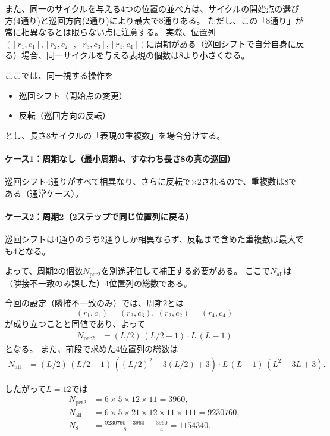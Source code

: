 \documentclass[a4paper,11pt,dvipdfmx]{jsarticle}
\theoremstyle{definition}
\begin{document}
また、同一のサイクルを与える4つの位置の並べ方は、サイクルの開始点の選び方(4通り)と巡回方向(2通り)により最大で$8$通りある。
ただし、この「$8$通り」が常に相異なるとは限らない点に注意する。
実際、位置列$([r_1,c_1],[r_2,c_2],[r_3,c_3],[r_4,c_4])$に周期がある（巡回シフトで自分自身に戻る）場合、同一サイクルを与える表現の個数は$8$より小さくなる。

ここでは、同一視する操作を
\begin{itemize}
  \item 巡回シフト（開始点の変更）
  \item 反転（巡回方向の反転）
\end{itemize}
とし、長さ8サイクルの「表現の重複数」を場合分けする。

\paragraph{ケース1：周期なし（最小周期4、すなわち長さ8の真の巡回）}
巡回シフト$4$通りがすべて相異なり、さらに反転で$\times 2$されるので、重複数は$8$である（通常ケース）。

\paragraph{ケース2：周期2（2ステップで同じ位置列に戻る）}
巡回シフトは$4$通りのうち$2$通りしか相異ならず、反転まで含めた重複数は最大でも$4$となる。

よって、周期2の個数$N_{\mathrm{per2}}$を別途評価して補正する必要がある。
ここで$N_{\mathrm{all}}$は（隣接不一致のみ課した）4位置列の総数である。

今回の設定（隣接不一致のみ）では、周期2とは
\[(r_1,c_1)=(r_3,c_3),\ (r_2,c_2)=(r_4,c_4)\]
が成り立つことと同値であり、よって
\begin{align}
  N_{\mathrm{per2}} &= (L/2)\,(L/2-1)\cdot L\,(L-1)
\end{align}
となる。
また、前段で求めた4位置列の総数は
\begin{align}
  N_{\mathrm{all}} &= (L/2)\,(L/2-1)\,\left((L/2)^2-3(L/2)+3\right)\cdot L\,(L-1)\,\left(L^2-3L+3\right).
\end{align}

したがって$L=12$では
\begin{align}
  N_{\mathrm{per2}} &= 6\times 5\times 12\times 11 = 3960,\\
  N_{\mathrm{all}} &= 6\times 5\times 21\times 12\times 11\times 111 = 9230760,\\
  N_8 &= \frac{9230760-3960}{8}+\frac{3960}{4}=1154340.
\end{align}
\end{document}
